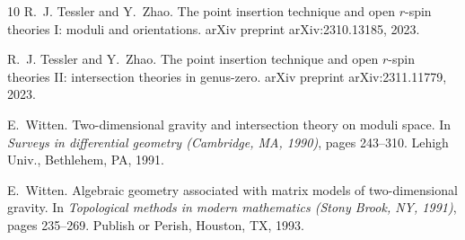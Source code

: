 \documentclass[11pt]{amsart}
\theoremstyle{definition}
\theoremstyle{remark}
\newcommand{\<}{\left<}
\renewcommand{\>}{\right>}
\numberwithin{equation}{section}
\begin{document}
\begin{thebibliography}{10}
R.~J. Tessler and Y.~Zhao.
\newblock The point insertion technique and open $r$-spin theories {I}: moduli
  and orientations.
\newblock arXiv preprint arXiv:2310.13185, 2023.

R.~J. Tessler and Y.~Zhao.
\newblock The point insertion technique and open $r$-spin theories {II}:
  intersection theories in genus-zero.
\newblock arXiv preprint arXiv:2311.11779, 2023.

E.~Witten.
\newblock Two-dimensional gravity and intersection theory on moduli space.
\newblock In {\em Surveys in differential geometry ({C}ambridge, {MA}, 1990)},
  pages 243--310. Lehigh Univ., Bethlehem, PA, 1991.

E.~Witten.
\newblock Algebraic geometry associated with matrix models of two-dimensional
  gravity.
\newblock In {\em Topological methods in modern mathematics ({S}tony {B}rook,
  {NY}, 1991)}, pages 235--269. Publish or Perish, Houston, TX, 1993.
\end{thebibliography}
\end{document}
